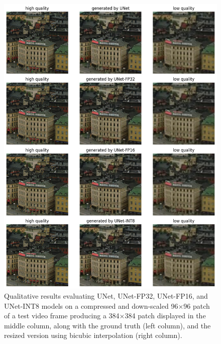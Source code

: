 \begin{figure}[ht]
\includegraphics[width=1.0\textwidth]{static/01_unet_qualitative_results.png}
\caption{Qualitative results evaluating UNet, UNet-FP32, UNet-FP16, and UNet-INT8 models on a compressed and down-scaled 96$\times$96 patch of a test video frame producing a 384$\times$384 patch displayed in the middle column, along with the ground truth (left column), and the resized version using bicubic interpolation (right column).}
\label{fig:building-qualitative-unet}
\end{figure}

